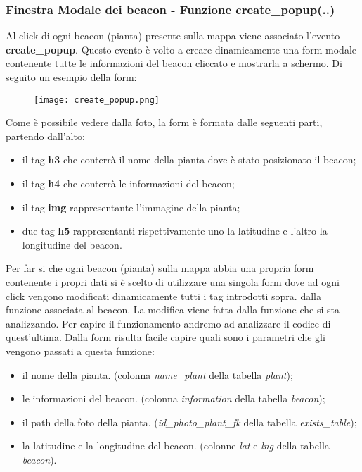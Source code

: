 \subsubsection{Finestra Modale dei beacon - Funzione create\_popup(..)}
Al click di ogni beacon (pianta) presente sulla mappa viene associato l'evento \textbf{create\_popup}. Questo evento è volto a creare dinamicamente una form modale contenente tutte le informazioni del beacon cliccato e mostrarla a schermo. Di seguito un esempio della form:
\begin{figure}[h]
	\centering
	\label{fig:create_popup}
	\texttt{[image: create\_popup.png]}
\end{figure} 
\newline
Come è possibile vedere dalla foto, la form è formata dalle seguenti parti, partendo dall'alto:
\begin{itemize}
\item il tag \textbf{h3} che conterrà il nome della pianta dove è stato posizionato il beacon;
\item il tag \textbf{h4} che conterrà le informazioni del beacon; 
\item il tag \textbf{img} rappresentante l'immagine della pianta; 
\item due tag \textbf{h5} rappresentanti rispettivamente uno la latitudine e l'altro la longitudine del beacon.
\end{itemize}
Per far si che ogni beacon (pianta) sulla mappa abbia una propria form contenente i propri dati si è scelto di utilizzare una singola form dove ad ogni click vengono modificati dinamicamente tutti i tag introdotti sopra.  dalla funzione associata al beacon. La modifica viene fatta dalla funzione che si sta analizzando.
Per capire il funzionamento andremo ad analizzare il codice di quest'ultima.
\newline
Dalla form risulta facile capire quali sono i parametri che gli vengono passati a questa funzione:
\begin{itemize}
\item il nome della pianta. (colonna \textit{name\_plant} della tabella \textit{plant});
\item le informazioni del beacon. (colonna \textit{information} della tabella \textit{beacon});
\item il path della foto della pianta. (\textit{id\_photo\_plant\_fk} della tabella \textit{exists\_table});
\item la latitudine e la longitudine del beacon. (colonne \textit{lat} e \textit{lng} della tabella \textit{beacon}).
\end{itemize}
